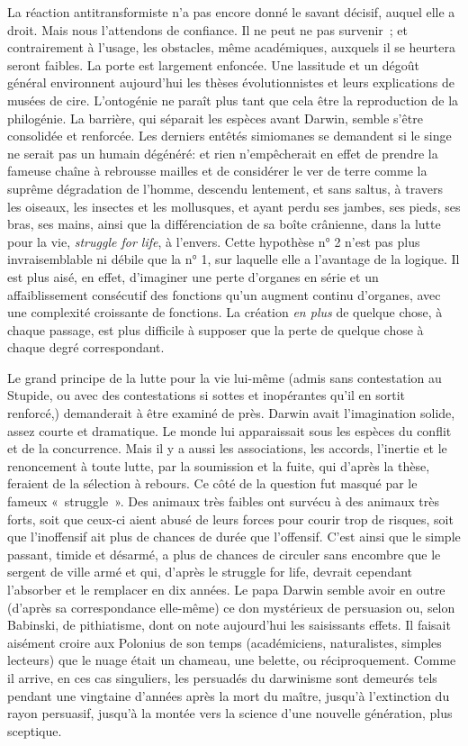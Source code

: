 \documentclass[french,twoside]{book} %
\begin{document}
La réaction antitransformiste n’a pas encore donné le savant décisif, auquel elle a droit. Mais nous l’attendons de confiance. Il ne peut ne pas survenir ; et contrairement à l’usage, les obstacles, même académiques, auxquels il se heurtera seront faibles. La porte est largement enfoncée. Une lassitude et un dégoût général environnent aujourd’hui les thèses évolutionnistes et leurs explications de musées de cire. L’ontogénie ne paraît plus tant que cela être la reproduction de la philogénie. La barrière, qui séparait les espèces avant Darwin, semble s’être consolidée et renforcée. Les derniers entêtés simiomanes se demandent si le singe ne serait pas un humain dégénéré: et rien n’empêcherait en effet de prendre la fameuse chaîne à rebrousse mailles et de considérer le ver de terre comme la suprême dégradation de l’homme, descendu lentement, et sans saltus, à travers les oiseaux, les insectes et les mollusques, et ayant perdu ses jambes, ses pieds, ses bras, ses mains, ainsi que la différenciation de sa boîte crânienne, dans la lutte pour la vie, {\itshape struggle for life}, à l’envers. Cette hypothèse n° 2 n’est pas plus invraisemblable ni débile que la n° 1, sur laquelle elle a l’avantage de la logique. Il est plus aisé, en effet, d’imaginer une perte d’organes en série et un affaiblissement consécutif des fonctions qu’un augment continu d’organes, avec une complexité croissante de fonctions. La création {\itshape en plus} de quelque chose, à chaque passage, est plus difficile à supposer que la perte de quelque chose à chaque degré correspondant.\par
Le grand principe de la lutte pour la vie lui-même (admis sans contestation au Stupide, ou avec des contestations si sottes et inopérantes qu’il en sortit renforcé,) demanderait à être examiné de près. Darwin avait l’imagination solide, assez courte et dramatique. Le monde lui apparaissait sous les espèces du conflit et de la concurrence. Mais il y a aussi les associations, les accords, l’inertie et le renoncement à toute lutte, par la soumission et la fuite, qui d’après la thèse, feraient de la sélection à rebours. Ce côté de la question fut masqué par le fameux « struggle ». Des animaux très faibles ont survécu à des animaux très forts, soit que ceux-ci aient abusé de leurs forces pour courir trop de risques, soit que l’inoffensif ait plus de chances de durée que l’offensif. C’est ainsi que le simple passant, timide et désarmé, a plus de chances de circuler sans encombre que le sergent de ville armé et qui, d’après le struggle for life, devrait cependant l’absorber et le remplacer en dix années. Le papa Darwin semble avoir en outre (d’après sa correspondance elle-même) ce don mystérieux de persuasion ou, selon Babinski, de pithiatisme, dont on note aujourd’hui les saisissants effets. Il faisait aisément croire aux Polonius de son temps (académiciens, naturalistes, simples lecteurs) que le nuage était un chameau, une belette, ou réciproquement. Comme il arrive, en ces cas singuliers, les persuadés du darwinisme sont demeurés tels pendant une vingtaine d’années après la mort du maître, jusqu’à l’extinction du rayon persuasif, jusqu’à la montée vers la science d’une nouvelle génération, plus sceptique.\par
\end{document}
